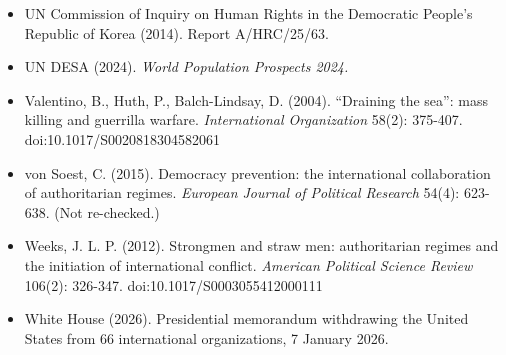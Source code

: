 \documentclass[
  10pt,
]{article}
\begin{document}
\begin{itemize}
  UK Ministry of Defence (2025). Defence Intelligence update on Russian casualties, 14 October 2025.
\item
  UN Commission of Inquiry on Human Rights in the Democratic People's Republic of Korea (2014).
  Report A/HRC/25/63.
\item
  UN DESA (2024). \emph{World Population Prospects 2024.}
\item
  Valentino, B., Huth, P., Balch-Lindsay, D. (2004). ``Draining the sea'': mass killing and
  guerrilla warfare. \emph{International Organization} 58(2): 375-407. doi:10.1017/S0020818304582061
\item
  von Soest, C. (2015). Democracy prevention: the international collaboration of authoritarian
  regimes. \emph{European Journal of Political Research} 54(4): 623-638. (Not re-checked.)
\item
  Weeks, J. L. P. (2012). Strongmen and straw men: authoritarian regimes and the initiation of
  international conflict. \emph{American Political Science Review} 106(2): 326-347.
  doi:10.1017/S0003055412000111
\item
  White House (2026). Presidential memorandum withdrawing the United States from 66 international
  organizations, 7 January 2026.
\end{itemize}
\end{document}
